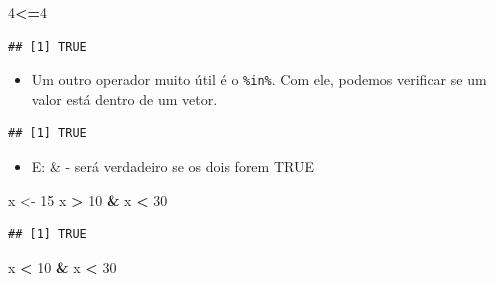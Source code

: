 \documentclass[
]{book}
\newenvironment{Shaded}{\begin{snugshade}}{\end{snugshade}}
\newcommand{\DecValTok}[1]{\textcolor[rgb]{0.00,0.00,0.81}{#1}}
\newcommand{\NormalTok}[1]{#1}
\newcommand{\OperatorTok}[1]{\textcolor[rgb]{0.81,0.36,0.00}{\textbf{#1}}}
\newcommand{\StringTok}[1]{\textcolor[rgb]{0.31,0.60,0.02}{#1}}
\providecommand{\tightlist}{%
  \setlength{\itemsep}{0pt}\setlength{\parskip}{0pt}}
\begin{document}
\begin{Shaded}
\begin{Highlighting}[]
\DecValTok{4}\OperatorTok{<=}\DecValTok{4}
\end{Highlighting}
\end{Shaded}

\begin{verbatim}
## [1] TRUE
\end{verbatim}

\begin{itemize}
\tightlist
\item
  Um outro operador muito útil é o \texttt{\%in\%}. Com ele, podemos verificar se um valor está dentro de um vetor.
\end{itemize}

\begin{Shaded}
\end{Shaded}

\begin{verbatim}
## [1] TRUE
\end{verbatim}

\begin{itemize}
\tightlist
\item
  E: \& - será verdadeiro se os dois forem TRUE
\end{itemize}

\begin{Shaded}
\begin{Highlighting}[]
\NormalTok{x <-}\StringTok{ }\DecValTok{15}
\NormalTok{x }\OperatorTok{>}\StringTok{ }\DecValTok{10} \OperatorTok{&}\StringTok{ }\NormalTok{x }\OperatorTok{<}\StringTok{ }\DecValTok{30}
\end{Highlighting}
\end{Shaded}

\begin{verbatim}
## [1] TRUE
\end{verbatim}

\begin{Shaded}
\begin{Highlighting}[]
\NormalTok{x }\OperatorTok{<}\StringTok{ }\DecValTok{10} \OperatorTok{&}\StringTok{ }\NormalTok{x }\OperatorTok{<}\StringTok{ }\DecValTok{30}
\end{Highlighting}
\end{Shaded}
\end{document}
